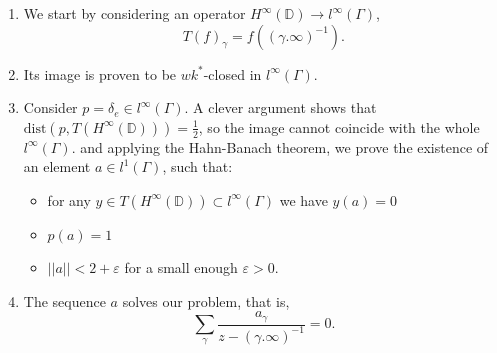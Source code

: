 \documentclass[11pt]{article}
\begin{document}
\begin{enumerate}
	\item We start by considering an operator $H^\infty(\mathbb{D}) \rightarrow l^\infty(\Gamma)$, 
	\[
	T(f)_\gamma = f((\gamma.\infty)^{-1}).
	\]
	\item Its image is proven to be $wk^*$-closed in $l^\infty(\Gamma)$.
	\item Consider $p = \delta_{e} \in l^\infty(\Gamma)$. A clever argument shows that \\ $\text{dist}(p, T(H^\infty(\mathbb{D}))) = \frac{1}{2}$, so the image cannot coincide with the whole $l^\infty(\Gamma)$. and applying the Hahn-Banach theorem, we prove the existence of an element $a \in l^1(\Gamma)$, such that:
	\begin{itemize}
		\item for any $y \in T(H^\infty(\mathbb{D})) \subset l^\infty(\Gamma)$ we have $y(a) = 0$
		\item $p(a) = 1$
		\item $||a|| < 2 + \varepsilon$ for a small enough $\varepsilon > 0$.
	\end{itemize}
	\item The sequence $a$ solves our problem, that is,
	\[
	\sum_{\gamma} \dfrac{a_\gamma}{z - (\gamma.\infty)^{-1}} = 0.
	\]
\end{enumerate}
\end{document}
